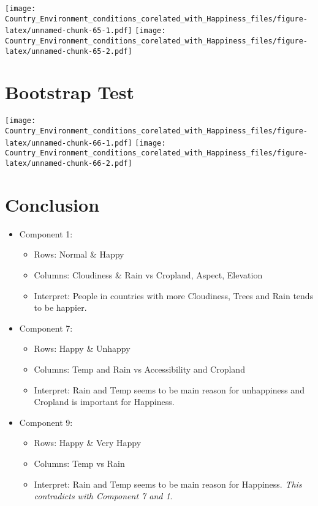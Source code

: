 \documentclass[]{book}
\providecommand{\tightlist}{%
  \setlength{\itemsep}{0pt}\setlength{\parskip}{0pt}}
\begin{document}
\texttt{[image: Country\_Environment\_conditions\_corelated\_with\_Happiness\_files/figure-latex/unnamed-chunk-65-1.pdf]}
\texttt{[image: Country\_Environment\_conditions\_corelated\_with\_Happiness\_files/figure-latex/unnamed-chunk-65-2.pdf]}

\hypertarget{bootstrap-test-3}{%
\section{Bootstrap Test}\label{bootstrap-test-3}}

\texttt{[image: Country\_Environment\_conditions\_corelated\_with\_Happiness\_files/figure-latex/unnamed-chunk-66-1.pdf]}
\texttt{[image: Country\_Environment\_conditions\_corelated\_with\_Happiness\_files/figure-latex/unnamed-chunk-66-2.pdf]}

\hypertarget{conclusion-3}{%
\section{Conclusion}\label{conclusion-3}}

\begin{itemize}
\tightlist
\item
  Component 1:

  \begin{itemize}
  \tightlist
  \item
    Rows: Normal \& Happy
  \item
    Columns: Cloudiness \& Rain vs Cropland, Aspect, Elevation
  \item
    Interpret: People in countries with more Cloudiness, Trees and Rain
    tends to be happier.
  \end{itemize}
\item
  Component 7:

  \begin{itemize}
  \tightlist
  \item
    Rows: Happy \& Unhappy
  \item
    Columns: Temp and Rain vs Accessibility and Cropland
  \item
    Interpret: Rain and Temp seems to be main reason for unhappiness and
    Cropland is important for Happiness.
  \end{itemize}
\item
  Component 9:

  \begin{itemize}
  \tightlist
  \item
    Rows: Happy \& Very Happy
  \item
    Columns: Temp vs Rain
  \item
    Interpret: Rain and Temp seems to be main reason for Happiness.
    \emph{This contradicts with Component 7 and 1}.
  \end{itemize}
\end{itemize}
\end{document}
